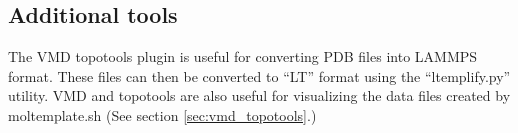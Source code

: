 \documentclass[11pt]{article}
\begin{document}
%


\subsection*{Additional tools}
The VMD topotools plugin \cite{topotools} is useful for 
converting PDB files into LAMMPS format.  These files can then
be converted to ``LT'' format using the ``ltemplify.py'' utility.
VMD \cite{VMD} and topotools are also useful for visualizing 
the data files created by moltemplate.sh
(See section \ref{sec:vmd_topotools}.)

\end{document}
